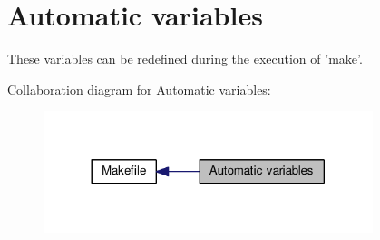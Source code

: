 \hypertarget{group___automatic___variables}{\section{Automatic variables}
\label{group___automatic___variables}
}


These variables can be redefined during the execution of 'make'.  


Collaboration diagram for Automatic variables\+:
\nopagebreak
\begin{figure}[H]
\begin{center}
\leavevmode
\includegraphics[width=272pt]{group___automatic___variables}
\end{center}
\end{figure}
